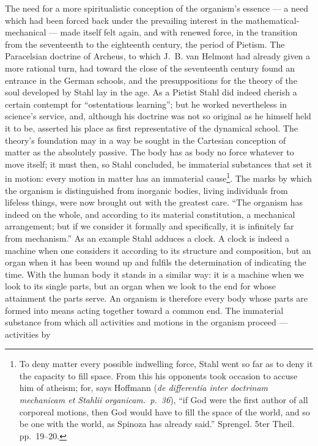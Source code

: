 \documentclass[12pt,a4paper]{book}
\begin{document}
The need for a more spiritualistic conception of the organism's essence --- a
need which had been forced back under the prevailing interest in the
mathematical-mechanical --- made itself felt again, and with renewed force, in
the transition from the seventeenth to the eighteenth century, the period of
Pietism. The Paracelsian doctrine of Archeus, to which J.~B. van Helmont had
already given a more rational turn, had toward the close of the seventeenth
century found an entrance in the German schools, and the presuppositions for
the theory of the soul developed by Stahl lay in the age. As a Pietist Stahl
did indeed cherish a certain contempt for ``ostentatious learning''; but he
worked nevertheless in science's service, and, although his doctrine was not so
original as he himself held it to be, asserted his place as first
representative of the dynamical school. The theory's foundation may in a way be
sought in the Cartesian conception of matter as the absolutely passive. The
body has as body no force whatever to move itself; it must then, so Stahl
concluded, be immaterial substances that set it in motion: every motion in
matter has an immaterial
cause\footnote{To deny matter every possible indwelling force, Stahl went so
far as to deny it the capacity to fill space. From this his opponents took
occasion to accuse him of atheism; for, says Hoffmann (\textit{de differentia
inter doctrinam mechanicam et Stahlii organicam.\ p.\ 36}), ``if God were the
first author of all corporeal motions, then God would have to fill the space of
the world, and so be one with the world, as Spinoza has already said.''
Sprengel. 5ter Theil. pp.~19--20.}. The marks by which the organism is
distinguished from inorganic bodies, living individuals from lifeless things,
were now brought out with the greatest care. ``The organism has indeed
\setcounter{footnote}{0}
on the whole, and according to its material constitution, a mechanical
arrangement; but if we consider it formally and specifically, it is infinitely
far from mechanism.'' As an example Stahl adduces a clock. A clock is indeed a
machine when one considers it according to its structure and composition, but
an organ when it has been wound up and fulfils the determination of indicating
the time. With the human body it stands in a similar way: it is a machine when
we look to its single parts, but an organ when we look to the end for whose
attainment the parts serve. An organism is therefore every body whose parts are
formed into means acting together toward a common end. The immaterial substance
from which all activities and motions in the organism proceed --- activities by
\end{document}
